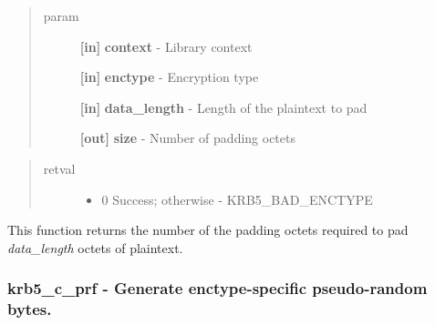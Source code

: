 \documentclass[letterpaper,10pt,english]{sphinxmanual}
\begin{document}
\begin{quote}\begin{description}
\item[{param}] \leavevmode
\textbf{{[}in{]}} \textbf{context} - Library context

\textbf{{[}in{]}} \textbf{enctype} - Encryption type

\textbf{{[}in{]}} \textbf{data\_length} - Length of the plaintext to pad

\textbf{{[}out{]}} \textbf{size} - Number of padding octets

\end{description}\end{quote}
\begin{quote}\begin{description}
\item[{retval}] \leavevmode\begin{itemize}
\item {} 
0   Success; otherwise - KRB5\_BAD\_ENCTYPE

\end{itemize}

\end{description}\end{quote}

This function returns the number of the padding octets required to pad \emph{data\_length} octets of plaintext.


\subsubsection{krb5\_c\_prf -  Generate enctype-specific pseudo-random bytes.}
\label{appdev/refs/api/krb5_c_prf:krb5-c-prf-generate-enctype-specific-pseudo-random-bytes}\label{appdev/refs/api/krb5_c_prf::doc}

\begin{fulllineitems}
\label{appdev/refs/api/krb5_c_prf:krb5_c_prf}
\end{fulllineitems}
\end{document}
